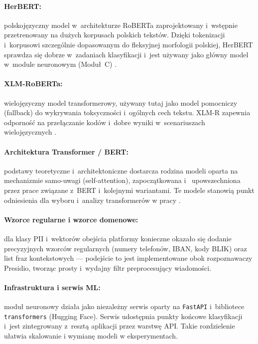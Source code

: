 \paragraph{HerBERT:} polskojęzyczny model w~architekturze RoBERTa zaprojektowany i~wstępnie
przetrenowany na dużych korpusach polskich tekstów. Dzięki tokenizacji i~korpusowi
szczególnie dopasowanym do fleksyjnej morfologii polskiej, HerBERT sprawdza się dobrze
w~zadaniach klasyfikacji i~jest używany jako główny model w~module neuronowym (Moduł~C)
\cite{bib:herbert}.

\paragraph{XLM-RoBERTa:} wielojęzyczny model transformerowy, używany tutaj jako model
pomocniczy (fallback) do wykrywania toksyczności i~ogólnych cech tekstu. XLM-R zapewnia
odporność na przełączanie kodów i~dobre wyniki w~scenariuszach wielojęzycznych \cite{bib:xlmr}.

\paragraph{Architektura Transformer / BERT:} podstawy teoretyczne i~architektoniczne dostarcza
rodzina modeli oparta na mechanizmie samo-uwagi (self-attention), zapoczątkowana i~
upowszechniona przez prace związane z~BERT i~kolejnymi wariantami. Te modele stanowią
punkt odniesienia dla wyboru i~analizy transformerów w pracy \cite{bib:bert,bib:transformers_survey}.

\paragraph{Wzorce regularne i wzorce domenowe:} dla klasy PII i~wektorów obejścia platformy konieczne
okazało się dodanie precyzyjnych wzorców regularnych (numery telefonów, IBAN, kody BLIK)
oraz list fraz kontekstowych — podejście to jest implementowane obok rozpoznawaczy
Presidio, tworząc prosty i~wydajny filtr preprocesujący wiadomości.

\paragraph{Infrastruktura i serwis ML:} moduł neuronowy działa jako niezależny serwis
oparty na \texttt{FastAPI} i~bibliotece \texttt{transformers} (Hugging Face). Serwis
udostępnia punkty końcowe klasyfikacji i~jest zintegrowany z~resztą aplikacji przez warstwę
API. Takie rozdzielenie ułatwia skalowanie i wymianę modeli w eksperymentach.

